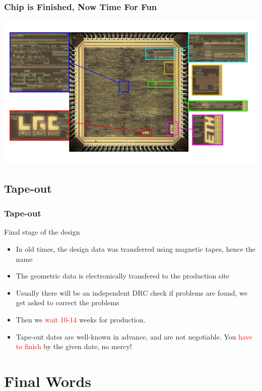 \documentclass[compress]{beamer}
\begin{document}
\begin{frame}
	\frametitle{Chip is Finished, Now Time For Fun}
	\begin{center}
		\includegraphics[width=\textwidth]{chip_finish}
	\end{center}
\end{frame}
\subsection[Tape-out]{Tape-out}
\begin{frame}
	\frametitle{Tape-out}
	\begin{block}{Final stage of the design}
		\begin{itemize}
			\item In old times, the design data was transferred using magnetic
			tapes, hence the name
			\item The geometric data is electronically transfered to the
			production site
			\item Usually there will be an independent DRC check if problems
			are found, we get asked to correct the problems
			\item Then we \textcolor{red}{wait 10-14} weeks for production.
			\item Tape-out dates are well-known in advance, and are not
			negotiable. You \textcolor{red}{have to finish} by the given date, no mercy! 
		\end{itemize}
	\end{block}
\end{frame}
\section[Final]{Final Words}
\end{document}
